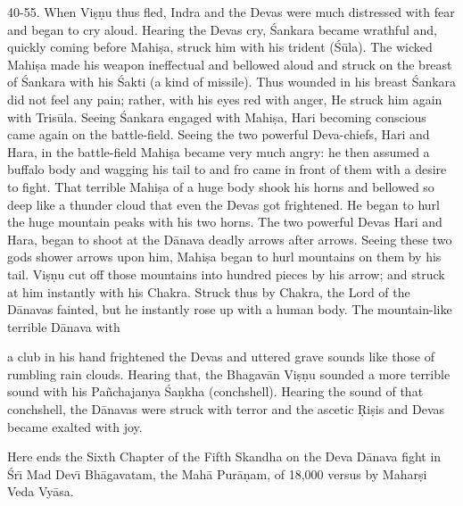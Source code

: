 40-55. When Vi\d{s}\d{n}u thus fled, Indra and the Devas were much distressed with fear and began to cry aloud. Hearing the Devas cry, \'Sankara became wrathful and, quickly coming before Mahi\d{s}a, struck him with his trident (\'S\=ula). The wicked Mahi\d{s}a made his weapon ineffectual and bellowed aloud and struck on the breast of \'Sankara with his \'Sakti (a kind of missile). Thus wounded in his breast \'Sankara did not feel any pain; rather, with his eyes red with anger, He struck him again with Tris\=ula. Seeing \'Sankara engaged with Mahi\d{s}a, Hari becoming conscious came again on the battle-field. Seeing the two powerful Deva-chiefs, Hari and Hara, in the battle-field Mahi\d{s}a became very much angry: he then assumed a buffalo body and wagging his tail to and fro came in front of them with a desire to fight. That terrible Mahi\d{s}a of a huge body shook his horns and bellowed so deep like a thunder cloud that even the Devas got frightened. He began to hurl the huge mountain peaks with his two horns. The two powerful Devas Hari and Hara, began to shoot at the D\=anava deadly arrows after arrows. Seeing these two gods shower arrows upon him, Mahi\d{s}a began to hurl mountains on them by his tail. Vi\d{s}\d{n}u cut off those mountains into hundred pieces by his arrow; and struck at him instantly with his Chakra. Struck thus by Chakra, the Lord of the D\=anavas fainted, but he instantly rose up with a human body. The mountain-like terrible D\=anava with

a club in his hand frightened the Devas and uttered grave sounds like those of rumbling rain clouds. Hearing that, the Bhagav\=an Vi\d{s}\d{n}u sounded a more terrible sound with his Pa\~nchajanya \'Sa\d{n}kha (conchshell). Hearing the sound of that conchshell, the D\=anavas were struck with terror and the ascetic \d{R}i\d{s}is and Devas became exalted with joy.

Here ends the Sixth Chapter of the Fifth Skandha on the Deva D\=anava fight in \'Sr\={\i} Mad Dev\={\i} Bh\=agavatam, the Mah\=a Pur\=a\d{n}am, of 18,000 versus by Mahar\d{s}i Veda Vy\=asa.




